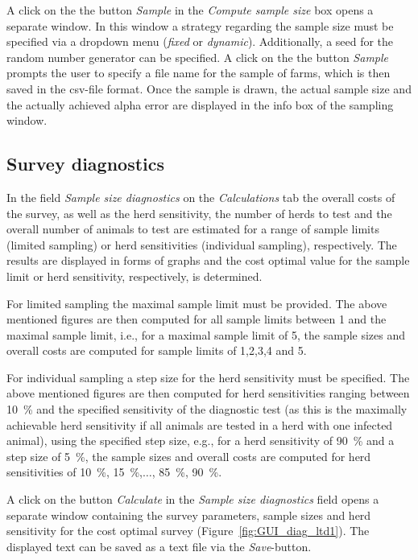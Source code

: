 \documentclass[nojss]{jss}
\begin{document}
A click on the the button \emph{Sample} in the \emph{Compute sample size} box opens a separate window. In this window a strategy regarding the sample size must be specified via a dropdown menu (\emph{fixed} or \emph{dynamic}). Additionally, a seed for the random number generator can be specified. A click on the the button \emph{Sample} prompts the user to specify a file name for the sample of farms, which is then saved in the csv-file format. Once the sample is drawn, the actual sample size and the actually achieved alpha error are displayed in the info box of the sampling window.


\subsection{Survey diagnostics}
\label{subsec:GUI_cost_analysis}

In the field \emph{Sample size diagnostics} on the \emph{Calculations} tab the overall costs of the survey, as well as the herd sensitivity, the number of herds to test and the overall number of animals to test are estimated for a range of sample limits (limited sampling) or herd sensitivities (individual sampling), respectively. The results are displayed in forms of graphs and the cost optimal value for the sample limit or herd sensitivity, respectively, is determined.

For limited sampling the maximal sample limit must be provided. The above mentioned figures are then computed for all sample limits between 1 and the maximal sample limit, i.e., for a maximal sample limit of 5, the sample sizes and overall costs are computed for sample limits of 1,2,3,4 and 5.

For individual sampling a step size for the herd sensitivity must be specified. The above mentioned figures are then computed for herd sensitivities ranging between 10~\% and the specified sensitivity of the diagnostic test (as this is the maximally achievable herd sensitivity if all animals are tested in a herd with one infected animal), using the specified step size, e.g., for a herd sensitivity of 90~\% and a step size of 5~\%, the sample sizes and overall costs are computed for herd sensitivities of 10~\%, 15~\%,$\ldots$, 85~\%, 90~\%.

A click on the button \emph{Calculate} in the \emph{Sample size diagnostics} field opens a separate window containing the survey parameters, sample sizes and herd sensitivity for the cost optimal survey (Figure~\ref{fig:GUI_diag_ltd1}). The displayed text can be saved as a text file via the \emph{Save}-button.
\end{document}
